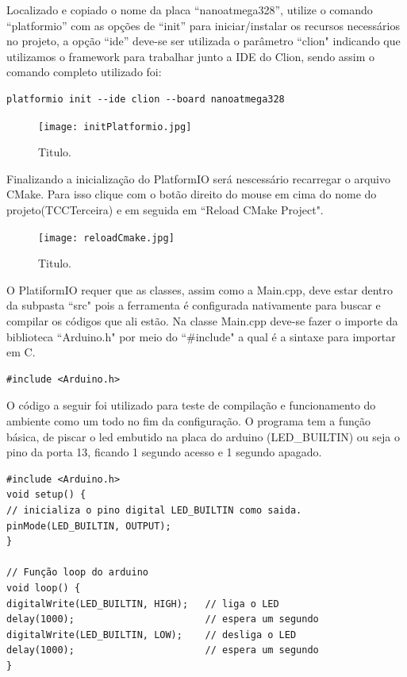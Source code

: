 \documentclass[a4paper,12pt,portuguese]{ufms-cpcx}
\begin{document}
Localizado e copiado o nome da placa ``nanoatmega328”, utilize o comando ``platformio” com as opções de ``init” para iniciar/instalar os recursos necessários no projeto,  a opção ``ide” deve-se ser utilizada o parâmetro ``clion" indicando que utilizamos o framework para trabalhar junto a IDE do Clion, sendo assim o comando completo utilizado foi:
\begin{lstlisting}
platformio init --ide clion --board nanoatmega328
\end{lstlisting}
\begin{figure}[H]	
	\centering
	\texttt{[image: initPlatformio.jpg]}
	\caption{Titulo.}
\end{figure}
Finalizando a inicialização do PlatformIO será nescessário recarregar o arquivo CMake. Para isso clique com o botão direito do mouse em cima do nome do projeto(TCCTerceira) e em seguida em ``Reload CMake Project".
\begin{figure}[H]	
	\centering
	\texttt{[image: reloadCmake.jpg]}
	\caption{Titulo.}
\end{figure}
O PlatiformIO requer que as classes, assim como a Main.cpp, deve estar dentro da subpasta ``src" pois a ferramenta é configurada nativamente para buscar e compilar os códigos que ali estão. Na classe Main.cpp deve-se fazer o importe da biblioteca ``Arduino.h" por meio do ``\#include" a qual é a sintaxe para importar em C.
\begin{lstlisting}
#include <Arduino.h>
\end{lstlisting}
O código a seguir foi utilizado para teste de compilação e funcionamento do ambiente como um todo no fim da configuração. O programa tem a função básica, de piscar o led embutido na placa do arduino (LED\_BUILTIN) ou seja o pino da porta 13, ficando 1 segundo acesso e 1 segundo apagado.

\begin{lstlisting}
#include <Arduino.h>
void setup() {
// inicializa o pino digital LED_BUILTIN como saida.
pinMode(LED_BUILTIN, OUTPUT);
}

// Função loop do arduino
void loop() {
digitalWrite(LED_BUILTIN, HIGH);   // liga o LED 
delay(1000);                       // espera um segundo
digitalWrite(LED_BUILTIN, LOW);    // desliga o LED
delay(1000);                       // espera um segundo
}
\end{lstlisting}
\end{document}
